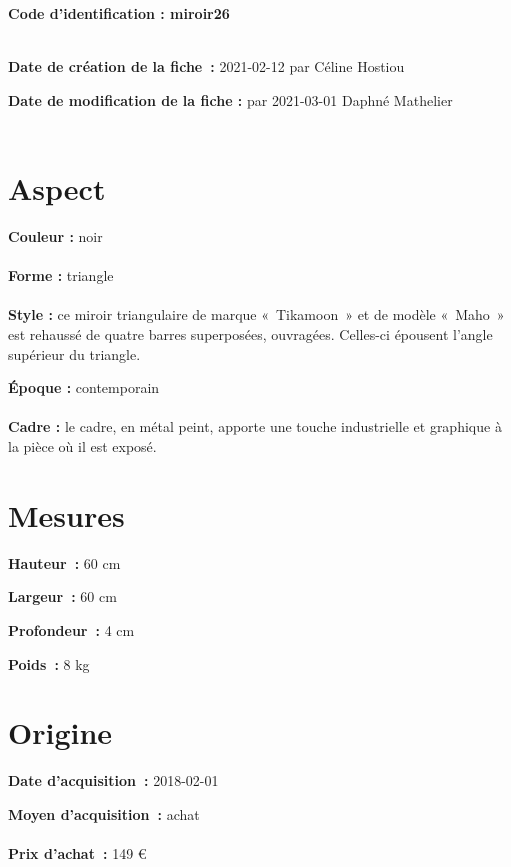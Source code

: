  
    
    
    {\bf \huge Code d’identification : miroir26}
    \\ \\ \hr
    \begin{center}
    \end{center}
    
    {\bf \large Date de création de la fiche :} 2021-02-12
    {par Céline Hostiou}
  
    {\bf \large Date de modification de la fiche :} 
    {par 2021-03-01}
    Daphné Mathelier \\ \\ \hr
    \section* {Aspect}
   {\bf \large Couleur :} noir
    \\ \\ {\bf \large Forme :}  triangle
    \\ \\ {\bf \large Style :} 
            ce miroir triangulaire de marque « Tikamoon » et de modèle « Maho »
                est rehaussé de quatre barres superposées, ouvragées. Celles-ci épousent l’angle supérieur du triangle.
        
        {\bf \large Époque :} contemporain
    \\ \\ {\bf \large Cadre :} le cadre, en métal peint, apporte une touche industrielle et graphique à la pièce où il est exposé.
    \section* {Mesures}
      
  {\bf \large Hauteur :} 60 cm
   
   {\bf \large Largeur :} 60 cm
    
   {\bf \large Profondeur :} 4 cm
    
   {\bf \large Poids :} 8 kg
     
    \section* {Origine}
    {\bf \large Date d’acquisition :} 2018-02-01

    {\bf \large Moyen d’acquisition :} achat
          \\ \\{\bf \large Prix d’achat :} 149 €
        
